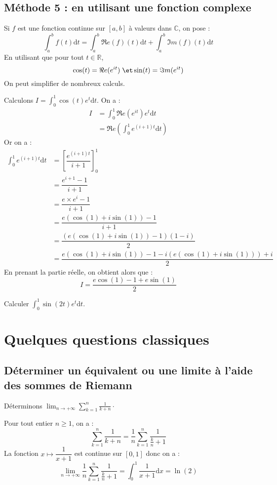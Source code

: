 \documentclass[french,11pt,twoside]{VcCours}
\newcommand{\dx}{\text{d}x}
\newcommand{\dt}{\text{d}t}
\begin{document}
\subsection{Méthode 5 : en utilisant une fonction complexe}
Si $f$ est une fonction continue sur $[a,b]$ à valeurs dans $\mathbb{C}$, on pose :
$$ \int_{a}^b f(t) \dt = \int_{a}^b \Re e(f)(t) \dt + \int_{a}^b \Im m(f)(t) \dt$$
En utilisant que pour tout $t \in \mathbb{R}$,
$$ \cos(t) = \Re e(e^{it}) \; \et \sin(t) = \Im m(e^{it})$$
On peut simplifier de nombreux calculs.

\medskip

\begin{Exemple} Calculons $I = \int_{0}^{1} \cos(t) e^t \dt$. On a :
\begin{align*}
I & = \int_{0}^{1} \Re e(e^{it}) e^t \dt \\
& = \Re e \left(\int_{0}^1e^{(i+1)t} \dt\right) 
\end{align*}
Or on a :
\begin{align*}
\int_{0}^1e^{(i+1)t} \dt & = \left[ \dfrac{e^{(i+1)t}}{i+1} \right]_{0}^1 \\
& = \dfrac{e^{i+1}-1}{i+1} \\
& = \dfrac{e\times e^i - 1 }{i+1} \\
& = \dfrac{e(\cos(1)+i \sin(1))-1}{i+1} \\
& = \dfrac{(e(\cos(1)+i \sin(1))-1)(1-i)}{2} \\
& = \dfrac{e(\cos(1)+i \sin(1))-1-i(e(\cos(1)+i \sin(1)))+i}{2} 
\end{align*}
En prenant la partie réelle, on obtient alors que :
$$ I = \dfrac{e\cos(1)-1+e \sin(1)}{2}$$
\end{Exemple}

\begin{ApplicationDirecte}{} Calculer $\int_{0}^1 \sin(2t)e^t \dt$.
\end{ApplicationDirecte}

\section{Quelques questions classiques}

\subsection{Déterminer un équivalent ou une limite à l'aide des sommes de Riemann}

\begin{Exemple} Déterminons $\lim_{n \rightarrow + \infty} \sum_{k=1}^n \frac{1}{k+n}\cdot$

\medskip

Pour tout entier $n \geq 1$, on a :
$$ \sum_{k=1}^n \frac{1}{k+n} = \frac{1}{n} \sum_{k=1}^n \frac{1}{\frac{k}{n}+1} $$
La fonction $x \mapsto \dfrac{1}{x+1}$ est continue sur $[0,1]$ donc on a :
$$ \lim_{n \rightarrow + \infty}  \frac{1}{n} \sum_{k=1}^n \frac{1}{\frac{k}{n}+1} = \int_{0}^1 \frac{1}{x+1} \dx = \ln(2)$$
\end{Exemple}
\end{document}
